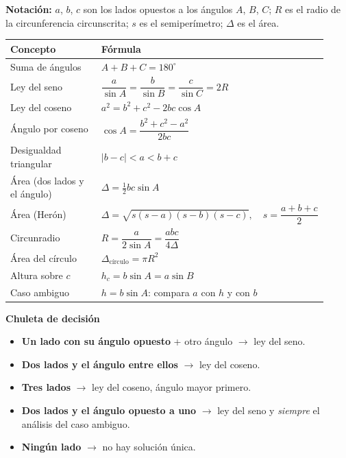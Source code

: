 \documentclass[12pt, letterpaper]{article}
\providecommand{\sen}{\sin}
\begin{document}
\begin{cuadroteoria}
  \small
  \textbf{Notación:} $a$, $b$, $c$ son los lados opuestos a los ángulos $A$,
  $B$, $C$; $R$ es el radio de la circunferencia circunscrita; $s$ es el
  semiperímetro; $\Delta$ es el área.
  \\[6pt]
  \begin{tabular}{@{}p{0.30\linewidth} p{0.62\linewidth}@{}}
    \toprule
    \textbf{Concepto} & \textbf{Fórmula} \\
    \midrule
    Suma de ángulos & $A+B+C=180^{\circ}$ \\[4pt]
    Ley del seno & $\dfrac{a}{\sen A}=\dfrac{b}{\sen B}=\dfrac{c}{\sen C}=2R$ \\[8pt]
    Ley del coseno & $a^{2}=b^{2}+c^{2}-2bc\cos A$ \\[4pt]
    Ángulo por coseno & $\cos A=\dfrac{b^{2}+c^{2}-a^{2}}{2bc}$ \\[8pt]
    Desigualdad triangular & $|b-c|<a<b+c$ \\[4pt]
    Área (dos lados y el ángulo) & $\Delta=\tfrac{1}{2}bc\sen A$ \\[4pt]
    Área (Herón) & $\Delta=\sqrt{s(s-a)(s-b)(s-c)},\quad s=\dfrac{a+b+c}{2}$ \\[8pt]
    Circunradio & $R=\dfrac{a}{2\sen A}=\dfrac{abc}{4\Delta}$ \\[4pt]
    Área del círculo & $\Delta_{\text{círculo}}=\pi R^{2}$ \\[8pt]
    Altura sobre $c$ & $h_{c}=b\sen A=a\sen B$ \\[4pt]
    Caso ambiguo & $h=b\sen A$: compara $a$ con $h$ y con $b$ \\
    \bottomrule
  \end{tabular}
\end{cuadroteoria}

\begin{cuadroinfo}
  \small
  \textbf{Chuleta de decisión}
  \begin{itemize}[leftmargin=1.2em, nosep, topsep=2pt]
    \item \textbf{Un lado con su ángulo opuesto} + otro ángulo $\rightarrow$
          ley del seno.
    \item \textbf{Dos lados y el ángulo entre ellos} $\rightarrow$ ley del
          coseno.
    \item \textbf{Tres lados} $\rightarrow$ ley del coseno, ángulo mayor
          primero.
    \item \textbf{Dos lados y el ángulo opuesto a uno} $\rightarrow$ ley del
          seno y \emph{siempre} el análisis del caso ambiguo.
    \item \textbf{Ningún lado} $\rightarrow$ no hay solución única.
  \end{itemize}
\end{cuadroinfo}
\end{document}
